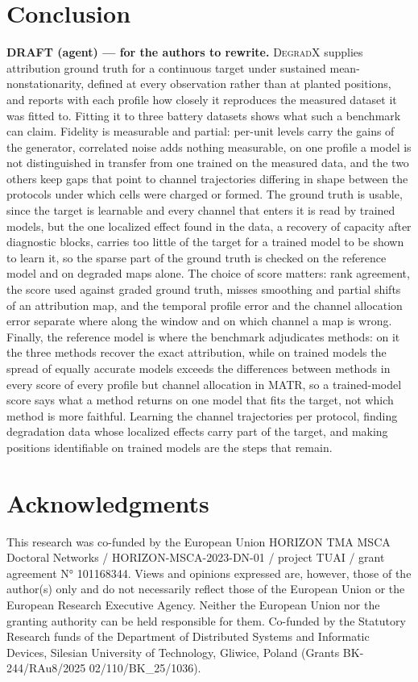 \documentclass{article}
\newif\ifreview \reviewtrue        %
\newcommand{\rev}[1]{\ifreview\textcolor[HTML]{0B5FA5}{#1}\else#1\fi}
\newcommand{\draftmark}{\ifreview\textbf{DRAFT (agent) --- for the authors to rewrite.} \fi}
\begin{document}
\section{Conclusion}
\rev{\draftmark \textsc{DegradX} supplies attribution ground truth for a continuous target under sustained mean-nonstationarity, defined at every observation rather than at planted positions, and reports with each profile how closely it reproduces the measured dataset it was fitted to. Fitting it to three battery datasets shows what such a benchmark can claim. Fidelity is measurable and partial: per-unit levels carry the gains of the generator, correlated noise adds nothing measurable, on one profile a model is not distinguished in transfer from one trained on the measured data, and the two others keep gaps that point to channel trajectories differing in shape between the protocols under which cells were charged or formed. The ground truth is usable, since the target is learnable and every channel that enters it is read by trained models, but the one localized effect found in the data, a recovery of capacity after diagnostic blocks, carries too little of the target for a trained model to be shown to learn it, so the sparse part of the ground truth is checked on the reference model and on degraded maps alone. The choice of score matters: rank agreement, the score used against graded ground truth, misses smoothing and partial shifts of an attribution map, and the temporal profile error and the channel allocation error separate where along the window and on which channel a map is wrong. Finally, the reference model is where the benchmark adjudicates methods: on it the three methods recover the exact attribution, while on trained models the spread of equally accurate models exceeds the differences between methods in every score of every profile but channel allocation in MATR, so a trained-model score says what a method returns on one model that fits the target, not which method is more faithful. Learning the channel trajectories per protocol, finding degradation data whose localized effects carry part of the target, and making positions identifiable on trained models are the steps that remain.}

\section*{Acknowledgments}
This research was co-funded by the European Union HORIZON TMA MSCA Doctoral Networks / HORIZON-MSCA-2023-DN-01 / project TUAI / grant agreement N° 101168344. Views and opinions expressed are, however, those of the author(s) only and do not necessarily reflect those of the European Union or the European Research Executive Agency. Neither the European Union nor the granting authority can be held responsible for them. Co-funded by the Statutory Research funds of the Department of Distributed Systems and Informatic Devices, Silesian University of Technology, Gliwice, Poland (Grants BK-244/RAu8/2025 02/110/BK\_25/1036).
\end{document}
